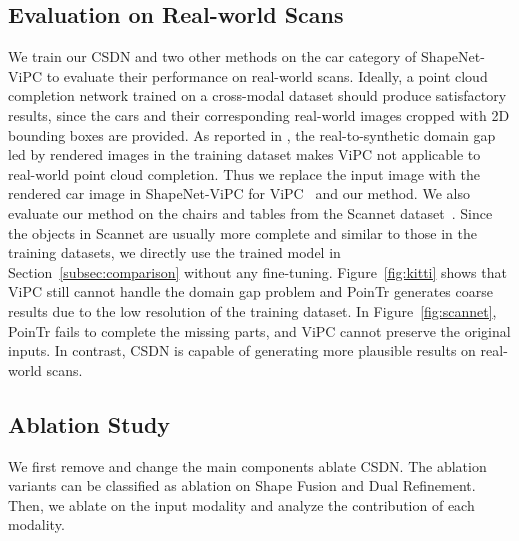 \subsection{Evaluation on Real-world Scans}
We train our CSDN and two other methods on the car category of ShapeNet-ViPC to evaluate their performance on real-world scans. 
Ideally, a point cloud completion network trained on a cross-modal dataset should produce satisfactory results, since the cars and their corresponding real-world images cropped with 2D bounding boxes are provided. As reported in \cite{zhang2021view}, the real-to-synthetic domain gap led by rendered images in the training dataset makes ViPC not applicable to real-world point cloud completion. Thus we replace the input image with the rendered car image in ShapeNet-ViPC for ViPC~\cite{zhang2021view} and our method.  We also evaluate our method on the chairs and tables from the Scannet dataset~\cite{dai2017scannet}. Since the objects in Scannet are usually more complete and similar to those in the training datasets, we directly use the trained model in Section~\ref{subsec:comparison} without any fine-tuning. Figure~\ref{fig:kitti} shows that ViPC still cannot handle the domain gap problem and PoinTr generates coarse results due to the low resolution of the training dataset. In Figure~\ref{fig:scannet}, PoinTr fails to complete the missing parts, and ViPC cannot preserve the original inputs. In contrast, CSDN is capable of generating more plausible results on real-world scans.



\subsection{Ablation Study}
We first remove and change the main components  ablate CSDN. The ablation variants can be classified as ablation on Shape Fusion and Dual Refinement. Then, we ablate on the input modality and analyze the contribution of each modality.

